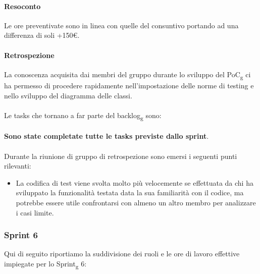 \paragraph{Resoconto}
Le ore preventivate sono in linea con quelle del consuntivo portando ad una differenza di soli +150\euro.

\paragraph{Retrospezione}
La conoscenza acquisita dai membri del gruppo durante lo sviluppo del PoC\textsubscript{g} ci ha permesso di procedere rapidamente nell'impostazione delle norme di testing e nello sviluppo del diagramma delle classi. 
\\\\
Le tasks che tornano a far parte del backlog\textsubscript{g} sono:
\\\\
\textbf{Sono state completate tutte le tasks previste dallo sprint}.
\\\\
\noindent Durante la riunione di gruppo di retrospezione sono emersi i seguenti punti rilevanti:
\begin{itemize}
	\item La codifica di test viene svolta molto più velocemente se effettuata da chi ha sviluppato la funzionalità testata data la sua familiarità con il codice, ma potrebbe essere utile confrontarsi con almeno un altro membro per analizzare i casi limite.
\end{itemize}

\subsubsection{Sprint 6}
Qui di seguito riportiamo la suddivisione dei ruoli e le ore di lavoro effettive impiegate per lo Sprint\textsubscript{g} 6:

